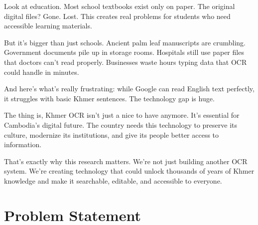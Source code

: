 \begin{table}[H]
    \caption{Why Khmer OCR is Desperately Needed}
    \vspace{10pt}
    \label{sec:textbook}
\end{table}

Look at education. Most school textbooks exist only on paper. The original digital files? Gone. Lost. This creates real problems for students who need accessible learning materials.

But it's bigger than just schools. Ancient palm leaf manuscripts are crumbling. Government documents pile up in storage rooms. Hospitals still use paper files that doctors can't read properly. Businesses waste hours typing data that OCR could handle in minutes.

And here's what's really frustrating: while Google can read English text perfectly, it struggles with basic Khmer sentences. The technology gap is huge.

The thing is, Khmer OCR isn't just a nice to have anymore. It's essential for Cambodia's digital future. The country needs this technology to preserve its culture, modernize its institutions, and give its people better access to information.

That's exactly why this research matters. We're not just building another OCR system. We're creating technology that could unlock thousands of years of Khmer knowledge and make it searchable, editable, and accessible to everyone.


\section{Problem Statement}
\label{sec:problem}

